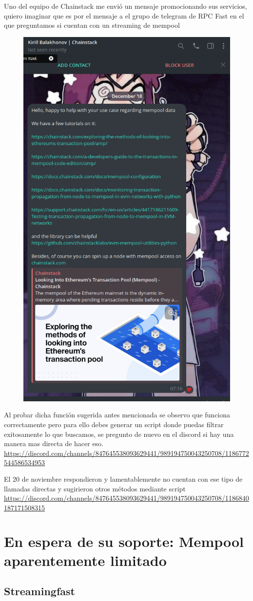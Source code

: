 Uno del equipo de Chainstack me envió un mensaje promocionando sus servicios, quiero imaginar que es por el mensaje a el grupo de telegram de RPC Fast en el que preguntamos si cuentan con un streaming de mempool

\begin{figure}
    \centering
    \includegraphics[width=.4\linewidth]{img//screenshots/Screenshot from 2023-12-18 12-51-25.png}
\end{figure}


Al probar dicha función sugerida antes mencionada se observo que funciona correctamente pero para ello debes generar un script donde puedas filtrar exitosamente lo que buscamos, se pregunto de nuevo en el discord si hay una manera mas directa de hacer eso. \url{https://discord.com/channels/847645538093629441/989194750043250708/1186772544586534953} 

El 20 de noviembre respondieron y lamentablemente no cuentan con ese tipo de llamadas directas y sugirieron otros métodos mediante script \url{https://discord.com/channels/847645538093629441/989194750043250708/1186840187171508315}


\clearpage
\section{En espera de su soporte: Mempool aparentemente limitado}
\subsection{Streamingfast}

